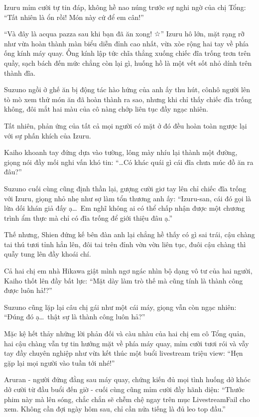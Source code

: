 \documentclass[../main.tex]{subfiles}
\begin{document}
Izuru mỉm cười tự tin đáp, không hề nao núng trước sự nghi ngờ của chị Tổng: ``Tất nhiên là ổn rồi! Món này cứ để em cân!''

\ct

``Và đây là acqua pazza sau khi bạn đã ăn xong! ☆'' Izuru hô lớn, mặt rạng rỡ như vừa hoàn thành màn biểu diễn đỉnh cao nhất, vừa xòe rộng hai tay về phía ống kính máy quay. Ống kính lập tức chĩa thẳng xuống chiếc đĩa trống trơn trên quầy, sạch bách đến mức chẳng còn lại gì, huống hồ là một vết sốt nhỏ dính trên thành đĩa.


Suzuno ngồi ở ghế ăn bị động tác hào hứng của anh ấy thu hút, cônhô người lên tò mò xem thử món ăn đã hoàn thành ra sao, nhưng khi chỉ thấy chiếc đĩa trống không, đôi mắt hai màu của cô nàng chớp liên tục đầy ngạc nhiên.

Tất nhiên, phản ứng của tất cả mọi người có mặt ở đó đều hoàn toàn ngược lại với sự phấn khích của Izuru.

Kaiho khoanh tay đứng dựa vào tường, lông mày nhíu lại thành một đường, giọng nói đầy mối nghi vấn khó tin: ``\dots Có khác quái gì cái đĩa chưa múc đồ ăn ra đâu?''

Suzuno cuối cùng cũng định thần lại, gượng cười giơ tay lên chỉ chiếc đĩa trống với Izuru, giọng nhỏ nhẹ như sợ làm tổn thương anh ấy: ``Izuru-san, cái đó gọi là lừa dối khán giả đấy ạ\dots\ Em nghĩ không ai có thể chấp nhận được một chương trình ẩm thực mà chỉ có đĩa trống để giới thiệu đâu ạ.''

Thế nhưng, Shien đứng kế bên đàn anh lại chẳng hề thấy có gì sai trái, cậu chàng tai thú tươi tỉnh hẳn lên, đôi tai trên đỉnh vờn vờn liên tục, đuôi cậu chàng thì quẫy tung lên đầy khoái chí.


Cả hai chị em nhà Hikawa giật mình ngơ ngác nhìn bộ dạng vô tư của hai người, Kaiho thốt lên đầy bất lực: ``Mặt dày làm trò thế mà cũng tính là thành công được luôn hả!?''

Suzuno cũng lặp lại câu chị gái như một cái máy, giọng vẫn còn ngạc nhiên: ``Đúng đó ạ\dots\ thật sự là thành công luôn hả?''

Mặc kệ hết thảy những lời phản đối và càu nhàu của hai chị em cô Tổng quản, hai cậu chàng vẫn tự tin hướng mặt về phía máy quay, mỉm cười tươi rói và vẫy tay đầy chuyên nghiệp như vừa kết thúc một buổi livestream triệu view: ``Hẹn gặp lại mọi người vào tuần tới nhé!''

Aruran - người đứng đằng sau máy quay, chứng kiến đủ mọi tình huống dở khóc dở cười từ đầu buổi đến giờ - cuối cùng cũng mỉm cười đầy hãnh diện: ``Thước phim này mà lên sóng, chắc chắn sẽ chễm chệ ngay trên mục LivestreamFail cho xem. Không cần đợi ngày hôm sau, chỉ cần nửa tiếng là đủ leo top đầu.''
\end{document}
